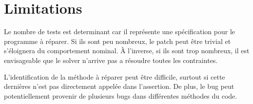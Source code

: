 \chapter{Limitations}
	\thispagestyle{limitation}
	
\par Le nombre de tests est determinant car il représente une spécification pour le programme à réparer. Si ils sont peu nombreux, le patch peut être trivial et s'éloignera du comportement nominal. À l'inverse, si ils sont trop nombreux, il est envisageable que le solver n'arrive pas a résoudre toutes les contraintes.

\par L'identification de la méthode à réparer peut être difficile, surtout si cette dernières n'est pas directement appelée dans l'assertion. De plus, le bug peut potentiellement provenir de plusieurs bugs dans différentes méthodes du code.